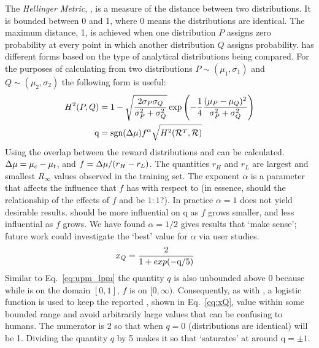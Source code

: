 The \emph{Hellinger Metric}, \hell{},  is a measure of the distance between two distributions. It is bounded between 0 and 1, where 0 means the distributions are identical. The maximum distance, 1, is achieved when one distribution $P$ assigns zero probability at every point in which another distribution $Q$ assigns probability. \hell{} has different forms based on the type of analytical distributions being compared. For the purposes of calculating \xQ{} from two distributions $P \sim (\mu_1,\sigma_1)$ and $Q\sim(\mu_2,\sigma_2)$ the following form is useful:
\begin{align}
    \hellmet &= 1-\sqrt{\frac{2\sigma_P\sigma_Q}{\sigma_P^2+\sigma_Q^2}}\exp{\left(-\frac{1}{4}\frac{(\mu_P-\mu_Q)^2}{\sigma_P^2+\sigma_Q^2}\right)} \\
    \text{q} &= \text{sgn}(\dmu)f^{\alpha}\sqrt{H^{2}(\rwdtrust,\rwd)} \label{eq:q}
\end{align}
Using \hell{} the overlap between the reward distributions \rwdtrustpredict{} and \rwdcandsim{} can be calculated. $\Delta \mu= \mu_c-\mu_t$, and $f = \Delta \mu/(r_H-r_L)$. The quantities $r_H$ and $r_L$ are largest and smallest $R_{\infty}$ values observed in the \surrogate{} training set. The exponent $\alpha$ is a parameter that affects the influence that $f$ has with respect to \hell (in essence, should the relationship of the effects of $f$ and \hell{} be $1:1$?). In practice $\alpha=1$ does not yield desirable results. \hell{} should be more influential on $\text{q}$ as $f$ grows smaller, and less influential as $f$ grows. We have found $\alpha=1/2$ gives results that `make sense'; future work could investigate the `best' value for $\alpha$ via user studies.
    \begin{align}
        \xQ &= \frac{2}{1+exp(-\text{q}/5)}\label{eq:xQ}
    \end{align}
Similar to Eq.~\ref{eq:upm_lpm} the quantity $q$ is also unbounded above $0$ because while \hell{} is on the domain $[0,1]$, $f$ is on $[0,\infty)$. Consequently, as with \xO{}, a logistic function is used to keep the reported \xQ{}, shown in Eq.~\ref{eq:xQ}, value within some bounded range and avoid arbitrarily large values that can be confusing to humans. The numerator is 2 so that when $q=0$ (distributions are identical) \xQ{} will be 1. Dividing the quantity $q$ by 5 makes it so that \xQ{} `saturates' at around $\text{q}=\pm1$.

